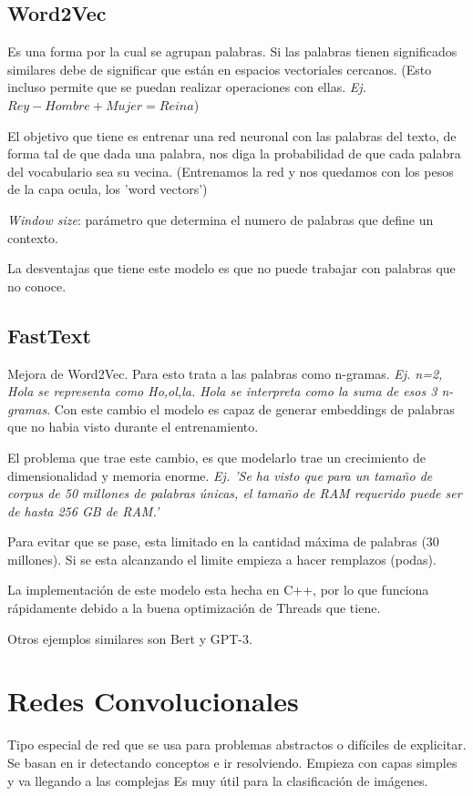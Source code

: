 \documentclass[titlepage,a4paper]{article}
\begin{document}
\subsection{Word2Vec}

Es una forma por la cual se agrupan palabras. Si las palabras tienen significados similares debe de significar que están en espacios vectoriales cercanos. (Esto incluso permite que se puedan realizar operaciones con ellas. \textit{Ej. $Rey - Hombre + Mujer = Reina$})

El objetivo que tiene es entrenar una red neuronal con las palabras del texto, de forma tal de que dada una palabra, nos diga la probabilidad de que cada palabra del vocabulario sea su vecina. (Entrenamos la red y nos quedamos con los pesos de la capa ocula, los 'word vectors')

\textit{Window size}: parámetro que determina el numero de palabras que define un contexto.

La desventajas que tiene este modelo es que no puede trabajar con palabras que no conoce. 

\subsection{FastText}
Mejora de Word2Vec. Para esto trata a las palabras como n-gramas. \textit{Ej. n=2, Hola se representa como Ho,ol,la. Hola se interpreta como la suma de esos 3 n-gramas}. Con este cambio el modelo es capaz de generar embeddings de palabras que no habia visto durante el entrenamiento.

El problema que trae este cambio, es que modelarlo trae un crecimiento de dimensionalidad y memoria enorme. \textit{Ej. 'Se ha visto que para un tamaño de corpus de 50 millones de palabras únicas, el tamaño de RAM requerido puede ser de hasta 256 GB de RAM.'}

Para evitar que se pase, esta limitado en la cantidad máxima de palabras (30 millones). Si se esta alcanzando el limite empieza a hacer remplazos (podas).

La implementación de este modelo esta hecha en C++, por lo que funciona rápidamente debido a la buena optimización de Threads que tiene.


Otros ejemplos similares son Bert y GPT-3.

\newpage

\section{Redes Convolucionales}
Tipo especial de red que se usa para problemas abstractos o difíciles de explicitar. Se basan en ir detectando conceptos e ir resolviendo. Empieza con capas simples y va llegando a las complejas Es muy útil para la clasificación de imágenes.
\end{document}
